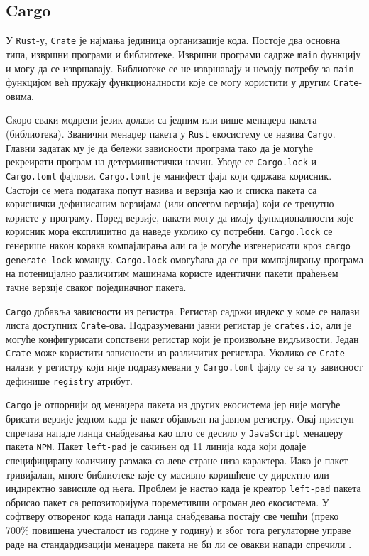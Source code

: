 \newpage
\subsection{Cargo}

У \verb|Rust|-у, \verb|Crate| је најмања јединица организације кода. Постоје два основна типа, извршни програми и библиотеке.
Извршни програми садрже \verb|main| функцију и могу да се извршавају. Библиотеке се не извршавају и немају потребу за \verb|main|
функцијом већ пружају функционалности које се могу користити у другим \verb|Crate|-овима. 

Скоро сваки модрени језик долази са једним или више менаџера пакета (библиотека). Званични менаџер пакета у \verb|Rust|
екосистему се назива \verb|Cargo|. Главни задатак му је да бележи зависности програма тако да је могуће рекреирати 
програм на детерминистички начин. Уводе се \verb|Cargo.lock| и \verb|Cargo.toml|
фајлови. \verb|Cargo.toml| је манифест фајл који одржава корисник. Састоји се мета података попут назива и верзија као и списка пакета са кориснички дефинисаним 
верзијама (или опсегом верзија) који се тренутно користе у програму. Поред верзије, пакети могу да имају функционалности које корисник мора експлицитно да наведе уколико су потребни.
\verb|Cargo.lock| се генерише након корака компајлирања али га је могуће изгенерисати кроз \verb|cargo| \verb|generate-lock| команду.
\verb|Cargo.lock| омогућава да се при компајлирању програма на потеницјално различитим машинама користе идентични пакети праћењем тачне верзије сваког појединачног пакета.

\verb|Cargo| добавља зависности из регистра. Регистар садржи индекс у коме се налази листа доступних \verb|Crate|-ова. Подразумевани јавни регистар је \verb|crates.io|, али је могуће 
конфигурисати сопствени регистар који је произвољне видљивости. Један \verb|Crate| може користити зависности из различитих регистара. Уколико се \verb|Crate| налази у регистру који није 
подразумевани у \verb|Cargo.toml| фајлу се за ту зависност дефинише \verb|registry| атрибут.

\verb|Cargo| је отпорнији од менаџера пакета из других екосистема јер није могуће брисати верзије једном када је пакет објављен на јавном регистру. 
Овај приступ спречава нападе ланца снабдевања као што се десило у \verb|JavaScript| менаџеру пакета \verb|NPM|. Пакет \verb|left-pad| 
је сачињен од 11 линија кода који додаје специфицирану количину размака са леве стране низа карактера. Иако је пакет тривијалан, многе библиотеке које 
су масивно коришћене су директно или индиректно зависиле од њега. Проблем је настао када је креатор \verb|left-pad| пакета обрисао 
пакет са репозиторијума пореметивши огроман део екосистема. У софтверу отвореног кода напади ланца снабдевања постају све чешћи (преко 700\% повишена учесталост
из године у годину) и због тога регулаторне управе раде на стандардизацији менаџера пакета не би ли се овакви напади спречили \cite{supply-chain}.

